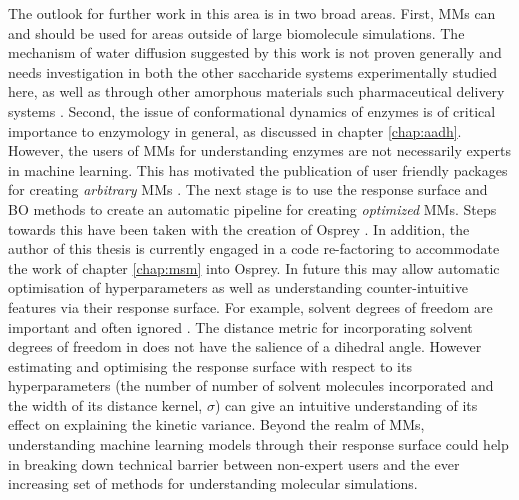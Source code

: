 The outlook for further work in this area is in two broad areas.  First, MMs can and should be used for areas outside of large biomolecule simulations. The mechanism of water diffusion suggested by this work is not proven generally and needs investigation in both the other saccharide systems experimentally studied here, as well as through other amorphous materials such pharmaceutical delivery systems \cite{hancockCharacteristicsSignificanceAmorphous1997}. Second, the issue of conformational dynamics of enzymes is of critical importance to enzymology in general, as discussed in chapter \ref{chap:aadh}.  However, the users of MMs for understanding enzymes are not necessarily experts in machine learning. This has motivated the publication of user friendly packages for creating \emph{arbitrary} MMs \cite{schererPyEMMASoftwarePackage2015a}\cite{beauchampMSMBuilder2ModelingConformational2011}.  The next stage is to use the response surface and BO methods to create an automatic  pipeline for creating \emph{optimized} MMs. Steps towards this have been taken with the creation of Osprey \cite{mcgibbonOspreyHyperparameterOptimization2016}.  In addition, the author of this thesis is currently engaged in a code re-factoring to accommodate the work of chapter \ref{chap:msm} into Osprey. In future this may allow automatic optimisation of hyperparameters as well as understanding counter-intuitive features via their response surface. For example, solvent degrees of freedom are important and often ignored \cite{guBuildingMarkovState2013}. The distance metric for incorporating solvent degrees of freedom in \cite{guBuildingMarkovState2013} does not have the salience of a dihedral angle. However estimating and optimising the response surface with respect to its hyperparameters (the number of number of solvent molecules incorporated and the width of its distance kernel, $\sigma$) can give an intuitive understanding of its effect on explaining the kinetic variance. Beyond the realm of MMs, understanding machine learning models through their response surface could help in breaking down technical barrier between non-expert users and the ever increasing set of methods for understanding molecular simulations. \cite{noeMachineLearningMolecular2020}

